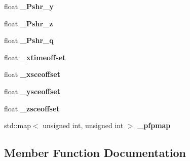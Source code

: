 \begin{DoxyCompactItemize}
\item 
float {\bfseries \+\_\+\+Pshr\+\_\+y}\hypertarget{classShowerMerger_a43b9620bb7b263478345b51e752cb4a2}{}\label{classShowerMerger_a43b9620bb7b263478345b51e752cb4a2}

\item 
float {\bfseries \+\_\+\+Pshr\+\_\+z}\hypertarget{classShowerMerger_af8094f3e46f6a4747a330afc1d2dc303}{}\label{classShowerMerger_af8094f3e46f6a4747a330afc1d2dc303}

\item 
float {\bfseries \+\_\+\+Pshr\+\_\+q}\hypertarget{classShowerMerger_ae2945b4d342ec4f487ed4798f017dd45}{}\label{classShowerMerger_ae2945b4d342ec4f487ed4798f017dd45}

\item 
float {\bfseries \+\_\+xtimeoffset}\hypertarget{classShowerMerger_a98adeb9a7abfcc0c4126f3c2fa394f26}{}\label{classShowerMerger_a98adeb9a7abfcc0c4126f3c2fa394f26}

\item 
float {\bfseries \+\_\+xsceoffset}\hypertarget{classShowerMerger_a060965f5293a88e921f4fcfc73494878}{}\label{classShowerMerger_a060965f5293a88e921f4fcfc73494878}

\item 
float {\bfseries \+\_\+ysceoffset}\hypertarget{classShowerMerger_a544004d4470bf7ead4c176685d58cfd6}{}\label{classShowerMerger_a544004d4470bf7ead4c176685d58cfd6}

\item 
float {\bfseries \+\_\+zsceoffset}\hypertarget{classShowerMerger_aa010b54e82a6bb0381946d7c064a9e7e}{}\label{classShowerMerger_aa010b54e82a6bb0381946d7c064a9e7e}

\item 
std\+::map$<$ unsigned int, unsigned int $>$ {\bfseries \+\_\+pfpmap}\hypertarget{classShowerMerger_ad0e0ff1fb206209963efb0690a3e9504}{}\label{classShowerMerger_ad0e0ff1fb206209963efb0690a3e9504}

\end{DoxyCompactItemize}


\subsection{Member Function Documentation}
